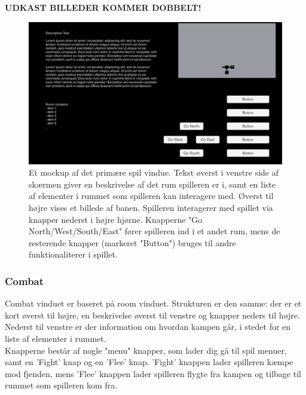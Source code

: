 \textbf{UDKAST BILLEDER KOMMER DOBBELT!}

\begin{figure}[H]
\centering
\includegraphics[width = \textwidth]{02-Body/Images/RoomMockup.PNG}
\caption{Et mockup af det primære spil vindue. Tekst øverst i venstre side af skærmen giver en beskrivelse af det rum spilleren er i, samt en liste af elementer i rummet som spilleren kan interagere med. Øverst til højre vises et billede af banen. Spilleren interagerer med spillet via knapper nederst i højre hjørne. Knapperne "Go {North/West/South/East}" fører spilleren ind i et andet rum, mens de resterende knapper (markeret "Button") bruges til andre funktionaliterer i spillet.}
\label{fig:Design-FE-mockup-room}
\end{figure}

\subsubsection{Combat}

Combat vinduet er baseret på room vinduet. Strukturen er den samme: der er et kort øverst til højre, en beskrivelse øverst til venstre og knapper neders til højre. Nederst til venstre er der information om hvordan kampen går,  i stedet for en liste af elementer i rummet.\\
Knapperne består af nogle "menu" knapper, som lader dig gå til spil menuer, samt en 'Fight' knap og en 'Flee' knap. 'Fight' knappen lader spilleren kæmpe mod fjenden, mens 'Flee' knappen lader spilleren flygte fra kampen og tilbage til rummet som spilleren kom fra.


